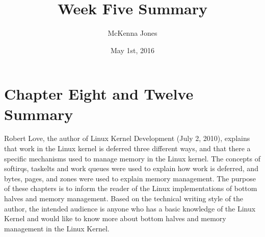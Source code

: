 \documentclass[letterpaper,10pt]{article}
\title{Week Five Summary}
\author{McKenna Jones}
\date{May 1st, 2016}
\begin{document}
\begin{titlepage}
\maketitle
\end{titlepage}

\section{Chapter Eight and Twelve Summary}
Robert Love, the author of Linux Kernel Development (July 2, 2010), explains that work in the Linux kernel is deferred three different ways, and that there a specific mechanisms used to manage memory in the Linux kernel. The concepts of softirqs, taskelts and work queues were used to explain how work is deferred, and bytes, pages, and zones were used to explain memory management. The purpose of these chapters is to inform the reader of the Linux implementations of bottom halves and memory management. Based on the technical writing style of the author, the intended audience is anyone who has a basic knowledge of the Linux Kernel and would like to know more about bottom halves and memory management in the Linux Kernel.
\end{document}
